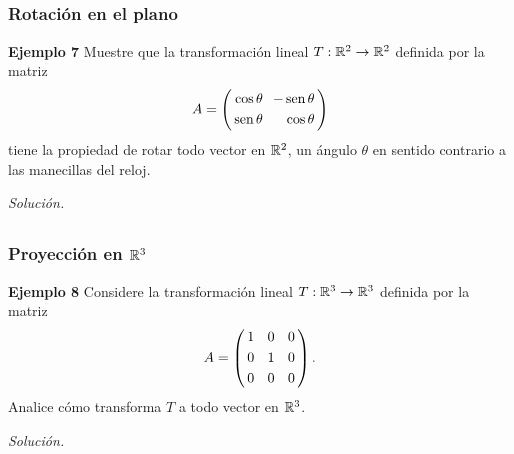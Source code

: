 
\subsection{}

\begin{frame}\frametitle{Rotación en el plano}

\begin{ej}{\textbf{Ejemplo 7}}
	\justifying
	Muestre que la transformación lineal  $T:\mathbb{R}^2\to \mathbb{R}^2$ definida por la matriz
	\[
	A = 
	\left(
	\begin{array}{@{\hspace{0.3\tabcolsep}}r@{\hspace{1.2\tabcolsep}}r@{\hspace{0.3\tabcolsep}}}
	\cos\theta & -\sen\theta \\[1mm]
	\sen\theta & \cos\theta 
	\end{array}
	\right)
	\]
	tiene la propiedad de rotar todo vector en $\mathbb{R}^2$, un ángulo $\theta$ en sentido contrario a las
	manecillas del reloj.
	
\end{ej}
\textit{Solución.}

\end{frame}


\subsection{}

\begin{frame}\frametitle{Proyección en $\mathbb{R}^3$}

\begin{ej}{\textbf{Ejemplo 8}}
	\justifying
	Considere la transformación lineal  $T:\mathbb{R}^3\to \mathbb{R}^3$ definida por la matriz
	\[
	A = 
	\left(
	\begin{array}{@{\hspace{0.3\tabcolsep}}c@{\hspace{1.6\tabcolsep}}c@{\hspace{1.6\tabcolsep}}c@{\hspace{0.3\tabcolsep}}}
	1 & 0 & 0 \\[1mm]
	0 & 1 & 0 \\[1mm]
	0 & 0 & 0 
	\end{array}
	\right).
	\]
	Analice cómo transforma $T$ a todo vector en $\mathbb{R}^3$.
	
\end{ej}
\textit{Solución.}

\end{frame}

